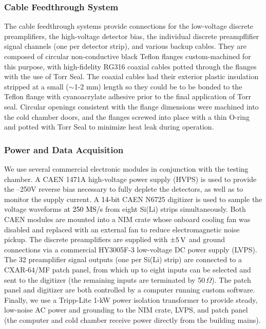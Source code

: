 \documentclass[journal]{IEEEtran}
\newcommand{\red}[1]{\textcolor{black}{#1}}
\begin{document}
\subsubsection{Cable Feedthrough System}
The cable feedthrough systems provide connections for the low-voltage discrete preamplifiers, the high-voltage detector bias, the individual discrete preampflifier signal channels (one per detector strip), and various backup cables. They are composed of circular non-conductive black Teflon flanges custom-machined for this purpose, with high-fidelity RG316 coaxial cables potted through the flanges with the use of Torr Seal. The coaxial cables had their exterior plastic insulation stripped at a small ($\sim$1-2 mm) length so they could be to be bonded to the Teflon flange with cyanoacrylate adhesive prior to the final application of Torr seal. Circular openings consistent with the flange dimensions were machined into the cold chamber doors, and the flanges screwed into place with a thin O-ring and potted with Torr Seal to minimize heat leak during operation.
%
\begin{figure}[t]
    \centering
    
    \label{fig:my_label}
\end{figure}

\subsubsection{Power and Data Acquisition}
We use several commercial electronic modules in conjunction with the testing chamber. A CAEN 1471A high-voltage power supply (HVPS) is used to provide the --250V reverse bias necessary to fully deplete the detectors, as well as to monitor the supply current. A \red{14-bit} CAEN N6725 digitizer is used to sample the voltage waveforms \red{at 250 MS/s} from eight Si(Li) strips simultaneously. Both CAEN modules are mounted into a NIM crate whose onboard cooling fan was disabled and replaced with an external fan to reduce electromagnetic noise pickup. The discrete preamplifiers are supplied with $\pm 5\text{\,V}$ and ground connections via a commercial HY3005F-3 low-voltage DC power supply (LVPS). The 32 preamplifier signal outputs (one per Si(Li) strip) are connected to a CXAR-64/MF patch panel, from which up to eight inputs can be selected and sent to the digitizer (the remaining inputs are terminated by 50$\,\Omega$). The patch panel and digitizer are both controlled by a computer running custom software. Finally, we use a Tripp-Lite 1-kW power isolation transformer to provide steady, low-noise AC power and grounding to the NIM crate, LVPS, and patch panel (the computer and cold chamber receive power directly from the building mains).
%
\end{document}
